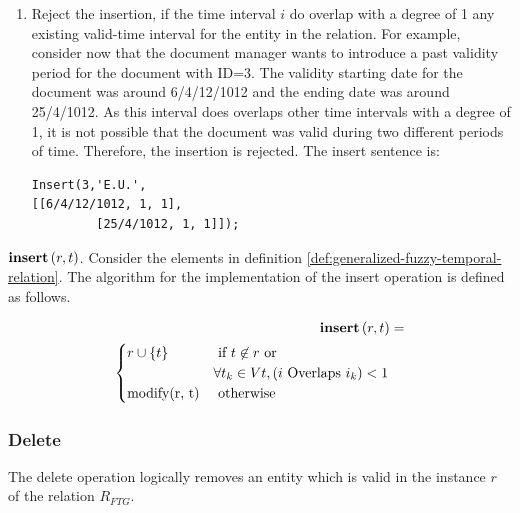\begin{enumerate}
\begin{enumerate}
	\item Reject the insertion, if the time interval $i$ do overlap with a degree of 1 any existing valid-time interval for the entity in the relation. For example, consider now that the document manager wants to introduce a past validity period for the document with ID=3. The validity starting date for the document was around 6/4/12/1012 and the ending date was around 25/4/1012. As this interval does overlaps other time intervals with a degree of 1, it is not possible that the document was valid during two different periods of time. Therefore, the insertion is rejected. The insert sentence is:

	      \begin{verbatim}
Insert(3,'E.U.',
[[6/4/12/1012, 1, 1],
         [25/4/1012, 1, 1]]);
	    \end{verbatim}
	\end{enumerate}

\end{enumerate}

\begin{definition}
 \emph{$\mbox{\textbf{insert}} \left(r, t \right)$}.
Consider the elements in definition \ref{def:generalized-fuzzy-temporal-relation}. The algorithm for the implementation of the insert operation is defined as follows.
\end{definition}




\begin{align}
\label{eq:insert-fuzzy-temporal}
\INS \left(r, t\right) &=\\
\begin{cases}
\nonumber
r \cup \lbrace t \rbrace
& \mbox{ if }  t \not \in r \mbox{ or }\\
\nonumber & \forall t_k \in Vt,  \left(i \mbox{ Overlaps } i_k\right) < 1\\
% 
\mbox{modify(r, t)} & \mbox{ otherwise }    %
\end{cases} 	
\end{align}
\subsubsection{\label{subsubsec:delete-fuzzy-temporal}Delete}
The delete operation logically removes an entity which is valid in the instance $r$ of the relation $R_{FTG}$.

